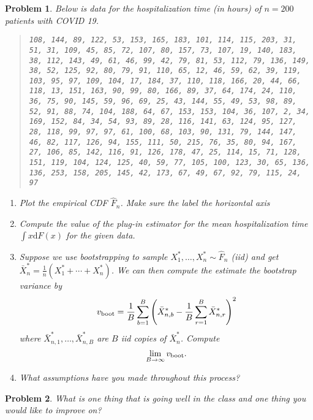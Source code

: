 \documentclass{article}
\newtheorem{problem}{Problem}
\renewcommand{\d}{\mathrm{d}}
\begin{document}
\clearpage
\begin{problem}

Below is data for the hospitalization time (in hours) of $n=200$ patients with COVID 19.
    \begin{quote}
    \texttt{108, 144, 89, 122, 53, 153, 165, 183, 101, 114, 115, 203, 31, 51, 31, 109, 45, 85, 72, 107, 80, 157,  73, 107, 19, 140, 183, 38, 112, 143, 49, 61, 46,  99, 42, 79, 81, 53, 112, 79, 136, 149, 38, 52, 125, 92, 80, 79, 91, 110, 65, 12, 46, 59, 62,  39, 119, 103, 95, 97, 109, 104, 17, 184, 37, 110, 118, 166, 20, 44, 66, 118, 13, 151, 163, 90, 99,  80, 166, 89, 37, 64, 174, 24, 110, 36, 75, 90, 145, 59, 96, 69, 25, 43, 144, 55, 49, 53, 98,  89, 52, 91, 88, 74, 104, 188, 64, 67, 153, 153, 104, 36, 107,  2, 34, 169, 152, 84, 34, 54, 93,  89, 28, 116, 141, 63, 124, 95, 127, 28, 118, 99,  97, 97, 61, 100, 68, 103, 90, 131, 79, 144, 147,  46, 82, 117, 126, 94, 155, 111, 50, 215, 76, 35,  80, 94, 167, 27, 106, 85, 142, 116, 91, 126, 178,  47, 25, 114, 15, 71, 128, 151, 119, 104, 124, 125,  40, 59, 77, 105, 100, 123, 30, 65, 136, 136, 253, 158, 205, 145, 42, 173, 67, 49, 67, 92, 79, 115,  24, 97}
    \end{quote}

    \begin{enumerate}[label=(\alph*),topsep=0pt]
        \item Plot the empirical CDF $\hat{F}_n$. Make sure the label the horizontal axis
        \item Compute the value of the plug-in estimator for the mean hospitalization time $\int x\d F(x)$ for the given data.

        \item Suppose we use bootstrapping to sample $X_1^*, \ldots, X_n^*\sim \hat{F}_n$ (iid) and get $\bar{X}_n^* = \frac{1}{n}(X_1^* + \cdots + X_n^*)$.
            We can then compute the estimate the bootstrap variance by
            \begin{equation*}
                v_{\textup{boot}} = \frac{1}{B} \sum_{b=1}^{B} \left( \bar{X}_{n,b}^* - \frac{1}{B} \sum_{r=1}^{B} \bar{X}_{n,r}^* \right)^2
            \end{equation*}
            where $\bar{X}_{n,1}^*, \ldots, \bar{X}_{n,B}^*$ are $B$ iid copies of $\bar{X}_n^*$.
            Compute
            \begin{equation*}
                \lim_{B\to\infty} v_{\textup{boot}}.
            \end{equation*}


        \item What assumptions have you made throughout this process?
    \end{enumerate}
\end{problem}

\begin{problem}
    What is one thing that is going well in the class and one thing you would like to improve on?
\end{problem}
\end{document}
